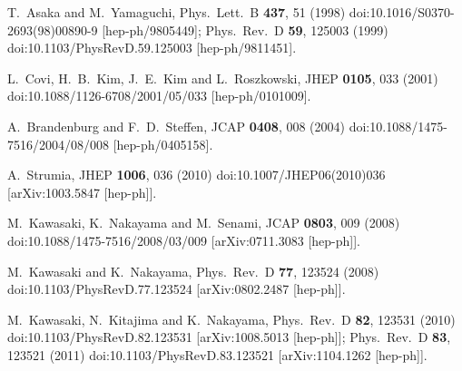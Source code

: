 \documentclass[12pt, a4paper]{article}
\begin{document}
\begin{thebibliography}{99}
  T.~Asaka and M.~Yamaguchi,
  Phys.\ Lett.\ B {\bf 437}, 51 (1998)
  doi:10.1016/S0370-2693(98)00890-9
  [hep-ph/9805449];
  Phys.\ Rev.\ D {\bf 59}, 125003 (1999)
  doi:10.1103/PhysRevD.59.125003
  [hep-ph/9811451].
  
  L.~Covi, H.~B.~Kim, J.~E.~Kim and L.~Roszkowski,
  JHEP {\bf 0105}, 033 (2001)
  doi:10.1088/1126-6708/2001/05/033
  [hep-ph/0101009].
  
  A.~Brandenburg and F.~D.~Steffen,
  JCAP {\bf 0408}, 008 (2004)
  doi:10.1088/1475-7516/2004/08/008
  [hep-ph/0405158].
  
  A.~Strumia,
  JHEP {\bf 1006}, 036 (2010)
  doi:10.1007/JHEP06(2010)036
  [arXiv:1003.5847 [hep-ph]].

  M.~Kawasaki, K.~Nakayama and M.~Senami,
  JCAP {\bf 0803}, 009 (2008)
  doi:10.1088/1475-7516/2008/03/009
  [arXiv:0711.3083 [hep-ph]].
  
  M.~Kawasaki and K.~Nakayama,
  Phys.\ Rev.\ D {\bf 77}, 123524 (2008)
  doi:10.1103/PhysRevD.77.123524
  [arXiv:0802.2487 [hep-ph]].
  
  M.~Kawasaki, N.~Kitajima and K.~Nakayama,
  Phys.\ Rev.\ D {\bf 82}, 123531 (2010)
  doi:10.1103/PhysRevD.82.123531
  [arXiv:1008.5013 [hep-ph]];
  Phys.\ Rev.\ D {\bf 83}, 123521 (2011)
  doi:10.1103/PhysRevD.83.123521
  [arXiv:1104.1262 [hep-ph]].
  

\end{thebibliography}
\end{document}

